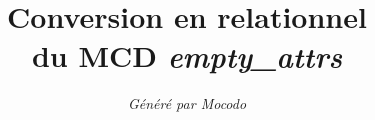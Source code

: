 \documentclass[a4paper]{article}
\title{Conversion en relationnel\\du MCD \emph{empty_attrs}}
\author{\emph{Généré par Mocodo}}
\begin{document}
\maketitle

\begin{itemize}

\end{itemize}
\end{document}
